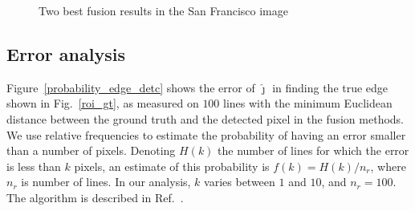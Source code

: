 \documentclass[journal]{IEEEtran}
\begin{document}
\begin{figure}[hbt]
	\centering
	\caption{Two best fusion results in the San Francisco image}
	\label{fusion_sf_met}
\end{figure}

\subsection{Error analysis}

Figure~\ref{probability_edge_detc} shows the error of $\widehat\jmath$ in finding the true edge shown in Fig.~\ref{roi_gt}, as measured on $100$ lines with
the minimum Euclidean distance between the ground truth and the detected pixel in the fusion methods.
We use relative frequencies to estimate the probability of having an error smaller than a number of pixels. 
Denoting $H(k)$ the number of lines for which the error is less than $k$ pixels, 
an estimate of this probability is $f(k)={H(k)}/{n_r}$, where $n_r$ is number of lines. 
In our analysis, $k$ varies between $1$ and $10$, and $n_r=100$. 
The algorithm is described in Ref.~\cite{fbgm}.
\end{document}
